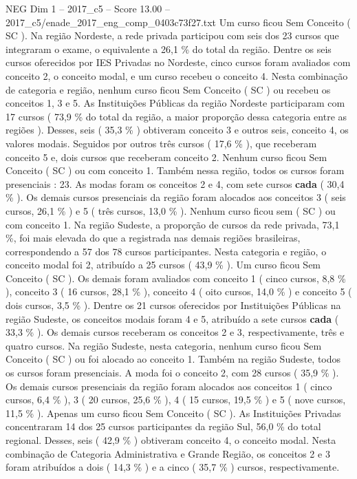 \begin{textsample}{NEG Dim 1 – 2017\_c5 – Score 13.00 – 2017\_c5/enade\_2017\_eng\_comp\_0403c73f27.txt}
Um curso ficou Sem Conceito ( SC ).
Na região Nordeste, a rede privada participou com seis dos 23 cursos que integraram o exame, o equivalente a 26,1 \% do total da região.
Dentre os seis cursos oferecidos por IES Privadas no Nordeste, cinco cursos foram avaliados com conceito 2, o conceito modal, e um curso recebeu o conceito 4.
Nesta combinação de categoria e região, nenhum curso ficou Sem Conceito ( SC ) ou recebeu os conceitos 1, 3 e 5.
As Instituições Públicas da região Nordeste participaram com 17 cursos ( 73,9 \% do total da região, a maior proporção dessa categoria entre as regiões ).
Desses, seis ( 35,3 \% ) obtiveram conceito 3 e outros seis, conceito 4, os valores modais.
Seguidos por outros três cursos ( 17,6 \% ), que receberam conceito 5 e, dois cursos que receberam conceito 2.
Nenhum curso ficou Sem Conceito ( SC ) ou com conceito 1.
Também nessa região, todos os cursos foram presenciais : 23.
As modas foram os conceitos 2 e 4, com sete cursos \textbf{cada} ( 30,4 \% ).
Os demais cursos presenciais da região foram alocados aos conceitos 3 ( seis cursos, 26,1 \% ) e 5 ( três cursos, 13,0 \% ).
Nenhum curso ficou sem ( SC ) ou com conceito 1.
Na região Sudeste, a proporção de cursos da rede privada, 73,1 \%, foi mais elevada do que a registrada nas demais regiões brasileiras, correspondendo a 57 dos 78 cursos participantes.
Nesta categoria e região, o conceito modal foi 2, atribuído a 25 cursos ( 43,9 \% ).
Um curso ficou Sem Conceito ( SC ).
Os demais foram avaliados com conceito 1 ( cinco cursos, 8,8 \% ), conceito 3 ( 16 cursos, 28,1 \% ), conceito 4 ( oito cursos, 14,0 \% ) e conceito 5 ( dois cursos, 3,5 \% ).
Dentre os 21 cursos oferecidos por Instituições Públicas na região Sudeste, os conceitos modais foram 4 e 5, atribuído a sete cursos \textbf{cada} ( 33,3 \% ).
Os demais cursos receberam os conceitos 2 e 3, respectivamente, três e quatro cursos.
Na região Sudeste, nesta categoria, nenhum curso ficou Sem Conceito ( SC ) ou foi alocado ao conceito 1.
Também na região Sudeste, todos os cursos foram presenciais.
A moda foi o conceito 2, com 28 cursos ( 35,9 \% ).
Os demais cursos presenciais da região foram alocados aos conceitos 1 ( cinco cursos, 6,4 \% ), 3 ( 20 cursos, 25,6 \% ), 4 ( 15 cursos, 19,5 \% ) e 5 ( nove cursos, 11,5 \% ).
Apenas um curso ficou Sem Conceito ( SC ).
As Instituições Privadas concentraram 14 dos 25 cursos participantes da região Sul, 56,0 \% do total regional.
Desses, seis ( 42,9 \% ) obtiveram conceito 4, o conceito modal.
Nesta combinação de Categoria Administrativa e Grande Região, os conceitos 2 e 3 foram atribuídos a dois ( 14,3 \% ) e a cinco ( 35,7 \% ) cursos, respectivamente.

\end{textsample}
